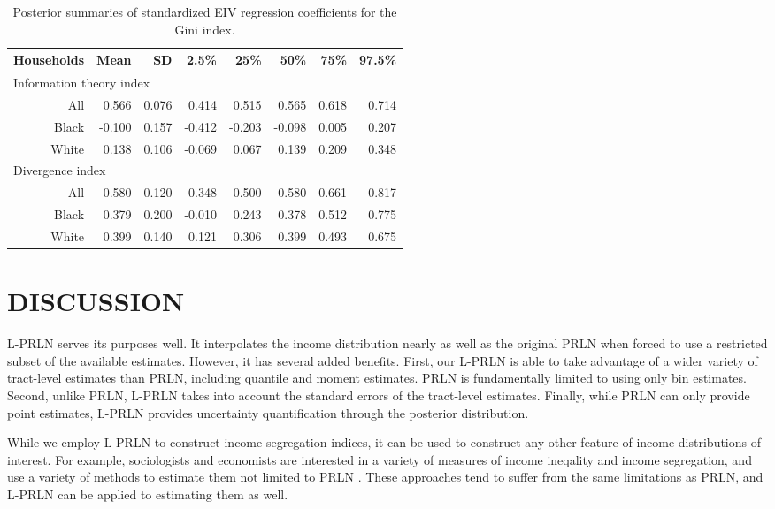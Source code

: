 \documentclass[12pt]{article}
\begin{document}
\begin{table}[ht]
  \centering
  \begin{tabular}{rrrrrrrr}
    \hline
    Households & Mean & SD & 2.5\% & 25\% & 50\% & 75\% & 97.5\% \\ 
    \hline
    \multicolumn{8}{l}{Information theory index} \\
    All   &  0.566 & 0.076 &  0.414 &  0.515 &  0.565 & 0.618 & 0.714 \\ 
    Black & -0.100 & 0.157 & -0.412 & -0.203 & -0.098 & 0.005 & 0.207 \\ 
    White &  0.138 & 0.106 & -0.069 &  0.067 &  0.139 & 0.209 & 0.348 \\ 
    \multicolumn{8}{l}{Divergence index} \\
    All   & 0.580 & 0.120 &  0.348 & 0.500 & 0.580 & 0.661 & 0.817 \\ 
    Black & 0.379 & 0.200 & -0.010 & 0.243 & 0.378 & 0.512 & 0.775 \\ 
    White & 0.399 & 0.140 &  0.121 & 0.306 & 0.399 & 0.493 & 0.675 \\ 
    \hline
  \end{tabular}
  \caption{Posterior summaries of standardized EIV regression coefficients for the Gini index.}
  \label{tab:eiv.results.std}
\end{table}

\section{DISCUSSION}\label{sec:discuss}
L-PRLN serves its purposes well. It interpolates the income distribution nearly as well as the original PRLN when forced to use a restricted subset of the available estimates. However, it has several added benefits. First, our L-PRLN is able to take advantage of a wider variety of tract-level estimates than PRLN, including quantile and moment estimates. PRLN is fundamentally limited to using only bin estimates. Second, unlike PRLN, L-PRLN takes into account the standard errors of the tract-level estimates. Finally, while PRLN can only provide point estimates, L-PRLN provides uncertainty quantification through the posterior distribution.

While we employ L-PRLN to construct income segregation indices, it can be used to construct any other feature of income distributions of interest. For example, sociologists and economists are interested in a variety of measures of income ineqality and income segregation, and use a variety of methods to estimate them not limited to PRLN \citep{kennedy1996income,jargowsky1996take,mayer2001growth,hardman2004neighbors,watson2009inequality}. These approaches tend to suffer from the same limitations as PRLN, and  L-PRLN can be applied to estimating them as well.
\end{document}
